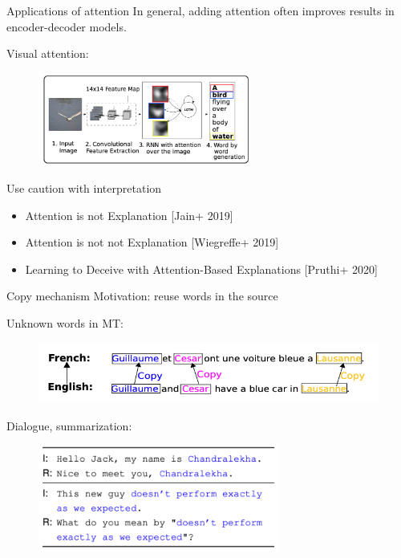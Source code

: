\documentclass[usenames,dvipsnames,11pt,aspectratio=169]{beamer}
\begin{document}
\begin{frame}
    {Applications of attention}
    In general, adding attention often improves results in encoder-decoder models.

    Visual attention:
    \vspace{-1em}
    \begin{figure}
        \includegraphics[width=7cm]{figures/visual-attention}
    \end{figure}
    \vspace{-1em}

    Use caution with interpretation\\
    \begin{itemize}
        \item[] Attention is not Explanation [Jain+ 2019]
        \item[] Attention is not not Explanation [Wiegreffe+ 2019]
        \item[] Learning to Deceive with Attention-Based Explanations [Pruthi+ 2020]
    \end{itemize}
\end{frame}

\begin{frame}
    {Copy mechanism}
    Motivation: reuse words in the source

    Unknown words in MT:
    \vspace{-1em}
    \begin{figure}
        \includegraphics[height=2cm]{figures/copy-mt}
    \end{figure}
    \vspace{-1em}

    Dialogue, summarization:
    \vspace{-1em}
    \begin{figure}
        \includegraphics[height=3.5cm]{figures/copy-dialogue}
    \end{figure}
    \vspace{-1em}
\end{frame}
\end{document}
